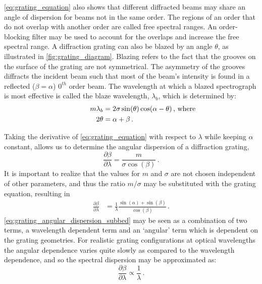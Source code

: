 \autoref{eq:grating_equation} also shows that different diffracted beams may share an angle of dispersion for beams not in the same order.
The regions of an order that do not overlap with another order are called free spectral ranges.
An order-blocking filter may be used to account for the overlaps and increase the free spectral range.
A diffraction grating can also be blazed by an angle $\theta$, as illustrated in \autoref{fig:grating_diagram}.
Blazing refers to the fact that the grooves on the surface of the grating are not symmetrical.
The asymmetry of the grooves diffracts the incident beam such that most of the beam's intensity is found in a reflected ($\beta = \alpha$) $0^{th}$ order beam.
The wavelength at which a blazed spectrograph is most effective is called the blaze wavelength, $\lambda_{b}$, which is determined by:
\begin{equation} \label{eq:blaze_wavelength}
    \begin{aligned}
        m\lambda_{b} &= 2\sigma\sin(\theta)\cos(\alpha - \theta)\rlap{\,,\ where}\\
        2\theta &= \alpha + \beta\,.
    \end{aligned}
\end{equation}

Taking the derivative of \autoref{eq:grating_equation} with respect to $\lambda$ while keeping $\alpha$ constant, allows us to determine the angular dispersion of a diffraction grating,
\begin{equation} \label{eq:grating_angular_dispersion}
    \frac{\partial \beta}{\partial \lambda} = \frac{m}{\sigma \cos(\beta)}\,.
\end{equation}
It is important to realize that the values for $m$ and $\sigma$ are not chosen independent of other parameters, and thus the ratio $m / \sigma$ may be substituted with the grating equation, resulting in
\begin{equation} \label{eq:grating_angular_dispersion_subbed}
    \begin{aligned}
        \frac{\partial \beta}{\partial \lambda} &= \frac{1}{\lambda} \frac{\sin(\alpha) + \sin(\beta)}{\cos(\beta)}\,.
    \end{aligned}
\end{equation}
\autoref{eq:grating_angular_dispersion_subbed} may be seen as a combination of two terms, a wavelength dependent term and an `angular' term which is dependent on the grating geometries.
For realistic grating configurations at optical wavelengths the angular dependence varies quite slowly as compared to the wavelength dependence, and so the spectral dispersion may be approximated as:
\begin{equation} \label{eq:grating_angular_dispersion_approx}
    \frac{\partial \beta}{\partial \lambda} \propto \frac{1}{\lambda}\,.
\end{equation}

